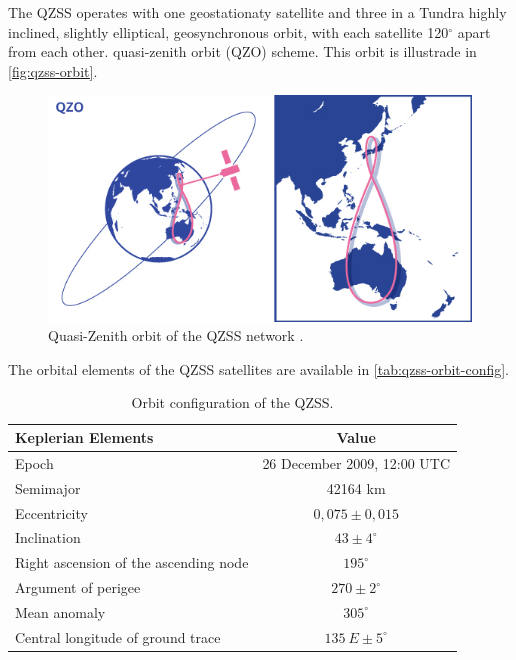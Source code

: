 The QZSS operates with one geostationaty satellite and three in a Tundra highly inclined, slightly elliptical, geosynchronous orbit, with each satellite 120$^{\circ}$ apart from each other. quasi-zenith orbit (QZO) scheme. This orbit is illustrade in \autoref{fig:qzss-orbit}.

\begin{figure}[!ht]
    \begin{center}
        \includegraphics[width=0.8\columnwidth]{figures/qzss-orbit}
        \caption{Quasi-Zenith orbit of the QZSS network \cite{qzss}.}
        \label{fig:qzss-orbit}
    \end{center}
\end{figure}

The orbital elements of the QZSS satellites are available in \autoref{tab:qzss-orbit-config}.

\begin{table}[!h]
    \centering
    \begin{tabular}{lc}
        \toprule[1.5pt]
        \textbf{Keplerian Elements} & \textbf{Value} \\
        \midrule
        Epoch                                   & 26 December 2009, 12:00 UTC \\
        Semimajor                               & 42164 km \\
        Eccentricity                            & $0,075 \pm 0,015$ \\
        Inclination                             & $43 \pm 4^{\circ}$ \\
        Right ascension of the ascending node   & $195^{\circ}$ \\
        Argument of perigee                     & $270 \pm 2^{\circ}$ \\
        Mean anomaly                            & $305^{\circ}$ \\
        Central longitude of ground trace       & $135\ E \pm 5^{\circ}$ \\
        \bottomrule[1.5pt]
    \end{tabular}
    \caption{Orbit configuration of the QZSS.}
    \label{tab:qzss-orbit-config}
\end{table}

